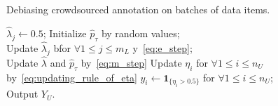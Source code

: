\incmargin{1em}
\begin{algorithm}[!t]
       \caption{Debiasing crowdsourced annotation on batches of data items.}\label{alg:debias}
\small

       \BlankLine
       $\hat{\lambda}_j \leftarrow 0.5$; 
       Initialize $\hat{p}_{\tau}$ by random values; \\
       {
           Update $\hat{\lambda}_j$ bfor $\forall 1 \leq j \leq m_L$ y~\eqref{eq:e_step}; \\
           Update $\hat{\lambda}$ and $\hat{p}_{\tau}$ by~\eqref{eq:m_step}
       }
       \BlankLine
       {
           Update $\eta_i$ for $\forall 1 \leq i \leq n_U$ by~\eqref{eq:updating_rule_of_eta}
       }
       $y_i \leftarrow \mathbf{1}_{\{\eta_i > 0.5\}}$ for $\forall 1 \leq i \leq n_U$; \\
       Output $Y_U$.
\end{algorithm}
\normalsize
\decmargin{1em}


